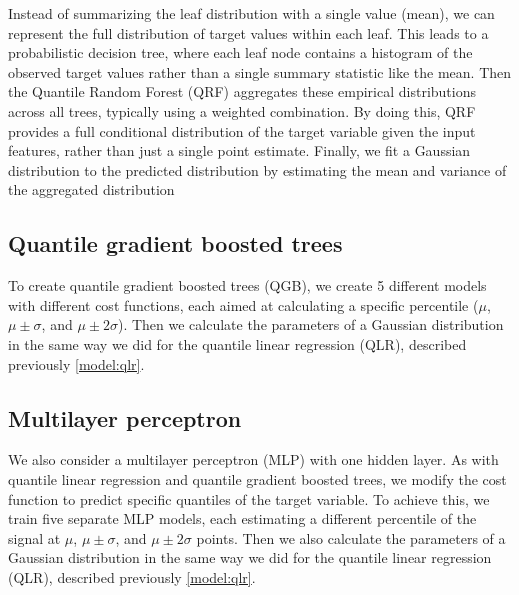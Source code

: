 \documentclass[12pt,a4paper]{book}
\begin{document}
Instead of summarizing the leaf distribution with a single value (mean), we can represent the full distribution of target values within each leaf. This leads to a probabilistic decision tree, where each leaf node contains a histogram of the observed target values rather than a single summary statistic like the mean. Then the Quantile Random Forest (QRF) aggregates these empirical distributions across all trees, typically using a weighted combination. By doing this, QRF provides a full conditional distribution of the target variable given the input features, rather than just a single point estimate. Finally, we fit a Gaussian distribution to the predicted distribution by estimating the mean and variance of the aggregated distribution

\subsection{Quantile gradient boosted trees} 
\label{model:qgb}
To create quantile gradient boosted trees (QGB), we create 5 different models with different cost functions, each aimed at calculating a specific percentile ($\mu$, $\mu\pm\sigma$, and $\mu\pm2\sigma$). Then we calculate the parameters of a Gaussian distribution in the same way we did for the quantile linear regression (QLR), described previously \ref{model:qlr}. 

\subsection{Multilayer perceptron} 
We also consider a multilayer perceptron (MLP) with one hidden layer. As with quantile linear regression and quantile gradient boosted trees, we modify the cost function to predict specific quantiles of the target variable. To achieve this, we train five separate MLP models, each estimating a different percentile of the \no{} signal at $\mu$, $\mu\pm\sigma$, and $\mu\pm2\sigma$ points. Then we also calculate the parameters of a Gaussian distribution in the same way we did for the quantile linear regression (QLR), described previously \ref{model:qlr}.
\end{document}
